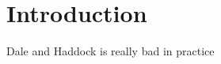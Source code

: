 \section{Introduction} \label{sec:introduction}

\cite{Dale1995}
\cite{dale91:_gener_refer_expres_invol_relat}

Dale and Haddock is really bad in practice
\cite{viethen06:_algor_for_gener_refer_expres}



